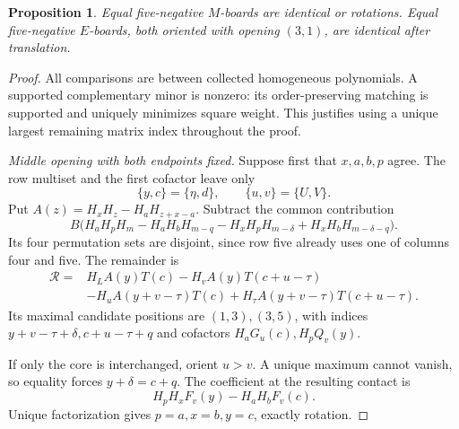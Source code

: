 \documentclass[11pt,a4paper]{amsart}
\numberwithin{equation}{section}
\theoremstyle{plain}
\newtheorem{proposition}[theorem]{Proposition}
\theoremstyle{definition}
\begin{document}
\begin{proposition}\label{prop:five-same-opening}
Equal five-negative \(M\)-boards are identical or rotations.  Equal
five-negative \(E\)-boards, both oriented with opening \((3,1)\),
are identical after translation.  
\end{proposition}

\begin{proof}
All comparisons are between collected homogeneous polynomials.  A
supported complementary minor is nonzero: its order-preserving matching
is supported and uniquely minimizes square weight.  This justifies
using a unique largest remaining matrix index throughout the proof.  

\emph{Middle opening with both endpoints fixed.}
Suppose first that \(x,a,b,p\) agree.  The row multiset and the first
cofactor leave only
\begin{equation}\label{eq:within-candidates}
 \{y,c\}=\{\eta,d\},\qquad \{u,v\}=\{U,V\}.
\end{equation}
Put \(A(z)=H_xH_z-H_aH_{z+x-a}\).  Subtract the common contribution
\[
 B\bigl(H_aH_pH_m-H_aH_bH_{m-q}
       -H_xH_pH_{m-\delta}+H_xH_bH_{m-\delta-q}\bigr).
\]
Its four permutation sets are disjoint, since row five already uses
one of columns four and five.  The remainder is
\begin{equation}\label{eq:five-middle-remainder}
 \begin{aligned}
 \mathcal R={}&H_LA(y)T(c)-H_vA(y)T(c+u-\tau)\\
 &-H_uA(y+v-\tau)T(c)
   +H_\tau A(y+v-\tau)T(c+u-\tau).
 \end{aligned}
\end{equation}
Its maximal candidate positions are \((1,3),(3,5)\), with indices
\(y+v-\tau+\delta,c+u-\tau+q\) and cofactors
\(H_aG_u(c),H_pQ_v(y)\).  

If only the core is interchanged, orient \(u>v\).  A unique maximum
cannot vanish, so equality forces \(y+\delta=c+q\).  The coefficient
at the resulting contact is
\[
 H_pH_xF_v(y)-H_aH_bF_v(c).
\]
Unique factorization gives \(p=a,x=b,y=c\), exactly rotation.  


\end{proof}
\end{document}
